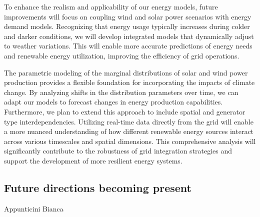 \documentclass[english]{article}
\numberwithin{definition}{section}
\numberwithin{theorem}{section}
\numberwithin{problem}{section}
\begin{document}
To enhance the realism and applicability of our energy models, future improvements will focus on coupling wind and solar power scenarios with energy demand models. Recognizing that energy usage typically increases during colder and darker conditions, we will develop integrated models that dynamically adjust to weather variations. This will enable more accurate predictions of energy needs and renewable energy utilization, improving the efficiency of grid operations.



The parametric modeling of the marginal distributions of solar and wind power production provides a flexible foundation for incorporating the impacts of climate change. By analyzing shifts in the distribution parameters over time, we can adapt our models to forecast changes in energy production capabilities. Furthermore, we plan to extend this approach to include spatial and generator type interdependencies. Utilizing real-time data directly from the grid will enable a more nuanced understanding of how different renewable energy sources interact across various timescales and spatial dimensions. This comprehensive analysis will significantly contribute to the robustness of grid integration strategies and support the development of more resilient energy systems.


\subsection{Future directions becoming present}
Appunticini Bianca\\



\newpage
\printbibliography[
heading=bibintoc,
title={Bibliography}]





\end{document}
